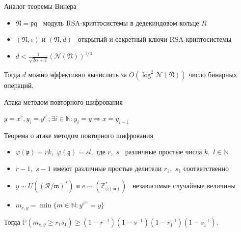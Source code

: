 \documentclass[8pt, xcolor=x11names]{beamer}
\begin{document}
\begin{frame}
    \begin{block}{Аналог теоремы Винера}
        \begin{itemize}
            \item $\mathfrak{N} = \mathfrak{p}\mathfrak{q}$ \textendash\ модуль RSA-криптосистемы в дедекиндовом кольце $R$
            
            \item $(\mathfrak{N}, e)$ и $(\mathfrak{N}, d)$ \textendash\ открытый и секретный ключи RSA-криптосистемы
            
            \item $d < \frac{1}{\sqrt{2\alpha+2}}(\mathcal{N}(\mathfrak{N}))^{1/4}$
        \end{itemize}
        Тогда $d$ можно эффективно вычислить за $O(\log^2 \mathcal{N}(\mathfrak{N}))$ число бинарных операций.
    \end{block}
    
    \begin{block}{Атака методом повторного шифрования}
        \begin{center}
            $y=x^e, y_i=y^{e^i}; \exists i \in \mathbb{N}: y_i=y \Rightarrow x=y_{i-1}$
        \end{center}
    \end{block}
    
    \begin{block}{Теорема о атаке методом повторного шифрования}
        \begin{itemize}
            \item $\varphi(\mathfrak{p})=rk,$ $\varphi(\mathfrak{q})=sl,$ где $r,$ $s$ \textendash\ различные простые числа $k,$ $l \in \mathbb{N}$
            
            \item $r-1,$ $s-1$ имеют различные простые делители $r_1,$ $s_1$ соответственно
            
            \item $y \sim U\left((\mathcal{R}/\mathfrak{m})^*\right)$ и $e \sim \left(\mathbb{Z}_{\varphi(\mathfrak{m})}^*\right)$ \textendash\ независимые случайные величины
            
            \item $m_{e,y}=\min\{m \in \mathbb{N}: y^{e^m}= y\}$
        \end{itemize}
        Тогда
        $
            \mathbb{P}\left(
                m_{e,y} \ge r_1s_1
            \right) \ge \left(
                1-r^{-1}
            \right)\left(
                1-s^{-1}
            \right)\left(
                1-r_1^{-1}
            \right)\left(
                1-s_1^{-1}
            \right).
        $
    \end{block}
\end{frame}
\end{document}
